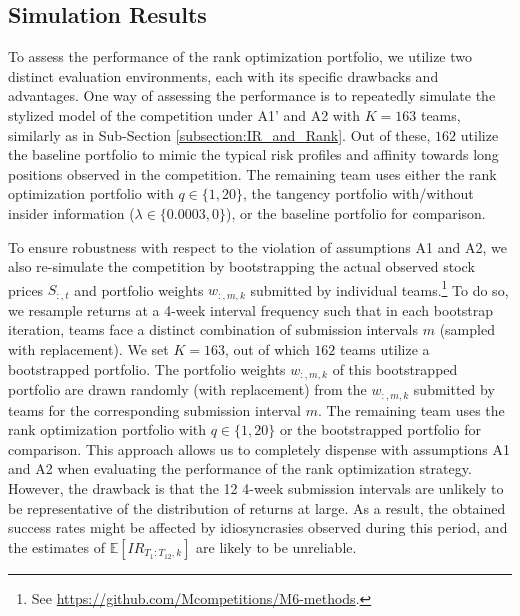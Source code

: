 \documentclass[3p,times,twocolumn]{elsarticle}
\begin{document}
\subsection{Simulation Results}

To assess the performance of the rank optimization portfolio, we utilize two distinct evaluation environments, each with its specific drawbacks and advantages.
One way of assessing the performance is to repeatedly simulate the stylized model of the competition under A1' and A2 with $K=163$ teams, similarly as in Sub-Section \ref{subsection:IR_and_Rank}.
Out of these, $162$ utilize the baseline portfolio to mimic the typical risk profiles and affinity towards long positions observed in the competition.
The remaining team uses either the rank optimization portfolio with $q \in \{1, 20\}$, the tangency portfolio with/without insider information ($\lambda \in \{0.0003, 0\}$), or the baseline portfolio for comparison.

To ensure robustness with respect to the violation of assumptions A1 and A2, we also re-simulate the competition by bootstrapping the actual observed stock prices $S_{:,t}$ and portfolio weights $w_{:,m,k}$ submitted by individual teams.\footnote{
    See \url{https://github.com/Mcompetitions/M6-methods}.
}
To do so, we resample returns at a 4-week interval frequency such that in each bootstrap iteration, teams face a distinct combination of submission intervals $m$ (sampled with replacement).
We set $K=163$, out of which $162$ teams utilize a bootstrapped portfolio.
The portfolio weights $w_{:,m,k}$ of this bootstrapped portfolio are drawn randomly (with replacement) from the $w_{:,m,k}$ submitted by teams for the corresponding submission interval $m$.
The remaining team uses the rank optimization portfolio with $q\in\{1,20\}$ or the bootstrapped portfolio for comparison.
This approach allows us to completely dispense with assumptions A1 and A2 when evaluating the performance of the rank optimization strategy.
However, the drawback is that the 12 4-week submission intervals are unlikely to be representative of the distribution of returns at large.
As a result, the obtained success rates might be affected by idiosyncrasies observed during this period, and the estimates of $\mathbb{E}[IR_{T_{1}:T_{12},k}]$ are likely to be unreliable.
\end{document}
